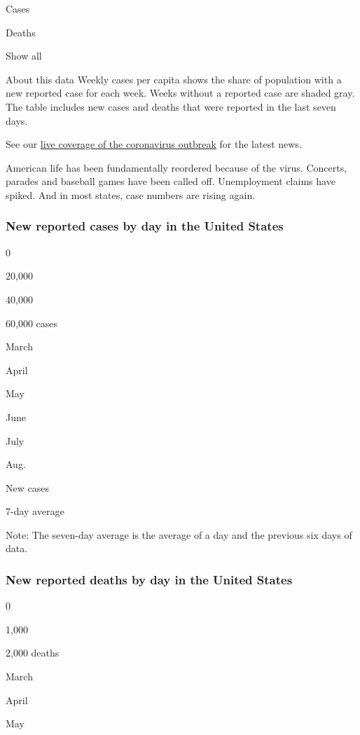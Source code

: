 Cases

Deaths

Show all

About this data Weekly cases per capita shows the share of population
with a new reported case for each week. Weeks without a reported case
are shaded gray. The table includes new cases and deaths that were
reported in the last seven days.

See our
\href{https://www.nytimes.com/2020/08/03/world/coronavirus-covid-19.html}{live
coverage of the coronavirus outbreak} for the latest news.

American life has been fundamentally reordered because of the virus.
Concerts, parades and baseball games have been called off. Unemployment
claims have spiked. And in most states, case numbers are rising again.

\hypertarget{new-reported-cases-by-day-in-the-united-states}{%
\subsubsection{New reported cases by day in the United
States}\label{new-reported-cases-by-day-in-the-united-states}}

0

20,000

40,000

60,000 cases

March

April

May

June

July

Aug.

New cases

7-day average

Note: The seven-day average is the average of a day and the previous six
days of data.

\hypertarget{new-reported-deaths-by-day-in-the-united-states}{%
\subsubsection{New reported deaths by day in the United
States}\label{new-reported-deaths-by-day-in-the-united-states}}

0

1,000

2,000 deaths

March

April

May


